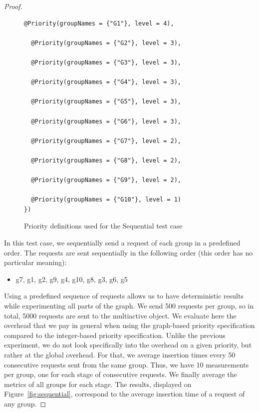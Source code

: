 \documentclass[11pt]{report}
\begin{document}
\begin{proof}
\begin{figure}[!ht]
\begin{minipage}{0.57\textwidth}
\begin{lstlisting}[frame=single]
  @Priority(groupNames = {"G1"}, level = 4),
  
  @Priority(groupNames = {"G2"}, level = 3),
  
  @Priority(groupNames = {"G3"}, level = 3),
  
  @Priority(groupNames = {"G4"}, level = 3),
  
  @Priority(groupNames = {"G5"}, level = 3),
  
  @Priority(groupNames = {"G6"}, level = 3),
  
  @Priority(groupNames = {"G7"}, level = 2),
  
  @Priority(groupNames = {"G8"}, level = 2),
  
  @Priority(groupNames = {"G9"}, level = 2),
  
  @Priority(groupNames = {"G10"}, level = 1)
})
 	\end{lstlisting}
 	\end{minipage}	
	\caption{Priority definitions used for the Sequential test case}
	\label{fig:sequential-decl}
\end{figure}

In this test case, we sequentially send a request of each group in a predefined order. The requests are sent sequentially in the following order (this order has no particular meaning):
\begin{itemize}
\item g7, g1, g2, g9, g4, g10, g8, g3, g6, g5
\end{itemize}
Using a predefined sequence of requests allows us to have deterministic results while experimenting all parts of the graph. We send 500 requests per group, so in total, 5000 requests are sent to the multiactive object. 
We evaluate here the overhead that we pay in general when using the graph-based priority specification compared to the integer-based priority specification. Unlike the previous experiment, we do not look specifically into the overhead on a given priority, but rather at the global overhead. For that, we average insertion times every 50 consecutive requests sent from the same group. Thus, we have 10 measurements per group, one for each stage of consecutive requests. We finally average the metrics of all groups for each stage. The results, displayed on Figure~\ref{fig:sequential}, correspond to the average insertion time of a request of any group.


\end{proof}
\end{document}
